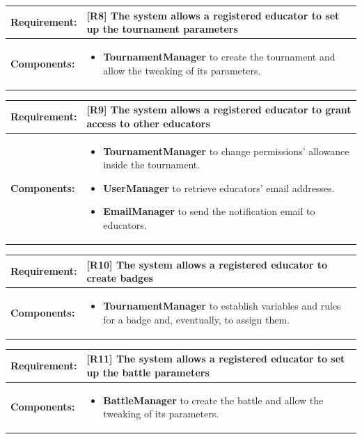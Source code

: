 \documentclass[12pt,oneside,a4paper]{article}
\begin{document}
\begin{table}[htbp]
\begin{tabular}{|l|p{12cm}|}
    \hline
    \textbf{Requirement:} & [R8] The system allows a registered educator to set up the tournament parameters\\
    \hline
    \textbf{Components:} & \begin{itemize}
        \item \textbf{TournamentManager} to create the tournament and allow the tweaking of its parameters.
    \end{itemize}\\
    \hline
\end{tabular}
\end{table}

\begin{table}[htbp]
\begin{tabular}{|l|p{12cm}|}
    \hline
    \textbf{Requirement:} & [R9] The system allows a registered educator to grant access to other educators\\
    \hline 
    \textbf{Components:} & \begin{itemize}
        \item \textbf{TournamentManager} to change permissions' allowance inside the tournament.
        \item \textbf{UserManager} to retrieve educators' email addresses.
        \item \textbf{EmailManager} to send the notification email to educators.
    \end{itemize}\\
    \hline
\end{tabular}
\end{table}

\begin{table}[htbp]
\begin{tabular}{|l|p{12cm}|}
    \hline
    \textbf{Requirement:} & [R10] The system allows a registered educator to create badges\\
    \hline
    \textbf{Components:} & \begin{itemize}
        \item \textbf{TournamentManager} to establish variables and rules for a badge and, eventually, to assign them.
    \end{itemize}\\
    \hline
\end{tabular}
\end{table}

\begin{table}[htbp]
\begin{tabular}{|l|p{12cm}|}
    \hline
    \textbf{Requirement:} & [R11] The system allows a registered educator to set up the battle parameters\\
    \hline
    \textbf{Components:} & \begin{itemize}
        \item \textbf{BattleManager} to create the battle and allow the tweaking of its parameters.
    \end{itemize}\\
    \hline
\end{tabular}
\end{table}
\end{document}
